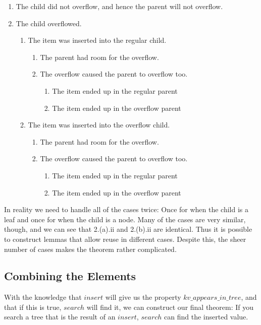 \begin{enumerate}
  \item The child did not overflow, and hence the parent will not overflow. 
  \item The child overflowed.
  \begin{enumerate}
    \item The item was inserted into the regular child.
    \begin{enumerate}
      \item The parent had room for the overflow.
      \item The overflow caused the parent to overflow too.
      \begin{enumerate}
        \item The item ended up in the regular parent
        \item The item ended up in the overflow parent
      \end{enumerate}
    \end{enumerate}
    \item The item was inserted into the overflow child.
    \begin{enumerate}
      \item The parent had room for the overflow.
      \item The overflow caused the parent to overflow too.
      \begin{enumerate}
        \item The item ended up in the regular parent
        \item The item ended up in the overflow parent
      \end{enumerate}
    \end{enumerate}
  \end{enumerate}
\end{enumerate}

In reality we need to handle all of the cases twice: Once for when the child is a leaf and once for when the child is a node. Many of the cases are very similar, though, and we can see that 2.(a).ii and 2.(b).ii are identical. Thus it is possible to construct lemmas that allow reuse in different cases. Despite this, the sheer number of cases makes the theorem rather complicated. 

\subsection{Combining the Elements}
\label{subsec:CombiningTheElements}
With the knowledge that $insert$ will give us the property $kv\_appears\_in\_tree$, and that if this is true, $search$ will find it, we can construct our final theorem: If you search a tree that is the result of an $insert$, $search$ can find the inserted value. 

